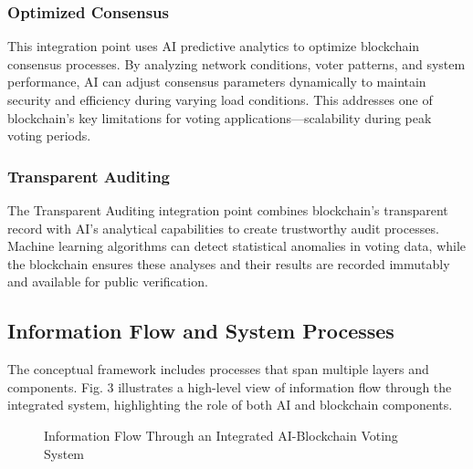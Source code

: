 \documentclass[conference]{IEEEtran}
\begin{document}
\subsubsection{Optimized Consensus}
This integration point uses AI predictive analytics to optimize blockchain consensus processes. By analyzing network conditions, voter patterns, and system performance, AI can adjust consensus parameters dynamically to maintain security and efficiency during varying load conditions. This addresses one of blockchain's key limitations for voting applications—scalability during peak voting periods.

\subsubsection{Transparent Auditing}
The Transparent Auditing integration point combines blockchain's transparent record with AI's analytical capabilities to create trustworthy audit processes. Machine learning algorithms can detect statistical anomalies in voting data, while the blockchain ensures these analyses and their results are recorded immutably and available for public verification.

\subsection{Information Flow and System Processes}
The conceptual framework includes processes that span multiple layers and components. Fig. 3 illustrates a high-level view of information flow through the integrated system, highlighting the role of both AI and blockchain components.

\begin{figure}[!h]
\centering
{}
\caption{Information Flow Through an Integrated AI-Blockchain Voting System}
\label{fig:workflow}
\end{figure}
\end{document}
